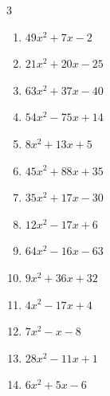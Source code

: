\begin{multicols}{3}
\begin{enumerate}
        \phantom{$=(7x+8)(2x+1)$}

  \item $49x^{2}+7x-2$

        \phantom{$=(7x-1)(7x+2)$}

  \item $21x^{2}+20x-25$

        \phantom{$=(3x+5)(7x-5)$}

  \item $63x^{2}+37x-40$

        \phantom{$=(9x-5)(7x+8)$}

  \item $54x^{2}-75x+14$

        \phantom{$=(9x-2)(6x-7)$}

\columnbreak %

\resetques

  \item $8x^{2}+13x+5$

        \phantom{$=(8x+5)(x+1)$}

  \item $45x^{2}+88x+35$

        \phantom{$=(5x+7)(9x+5)$}

  \item $35x^{2}+17x-30$

        \phantom{$=(7x-5)(5x+6)$}

  \item $12x^{2}-17x+6$

        \phantom{$=(3x-2)(4x-3)$}

  \item $64x^{2}-16x-63$

        \phantom{$=(8x+7)(8x-9)$}

  \item $9x^{2}+36x+32$

        \phantom{$=(3x+8)(3x+4)$}

  \item $4x^{2}-17x+4$

        \phantom{$=(x-4)(4x-1)$}

  \item $7x^{2}-x-8$

        \phantom{$=(7x-8)(x+1)$}

  \item $28x^{2}-11x+1$

        \phantom{$=(4x-1)(7x-1)$}

  \item $6x^{2}+5x-6$


\end{enumerate}
\end{multicols}
